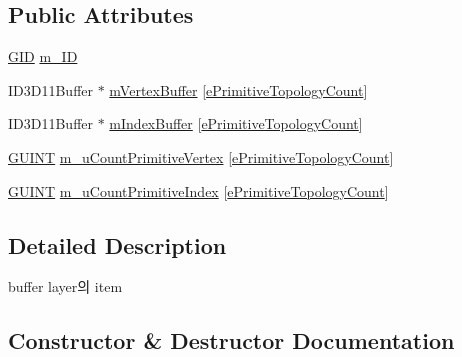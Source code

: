 \subsection*{Public Attributes}
\begin{DoxyCompactItemize}
\item 
\hyperlink{_g_types_8h_a5b96ecb16d8e437977d12cd40aa6f6d8}{G\+I\+D} \hyperlink{class_c_g_d_c_direct_x11_buffer_layer_item_adf7f1aafcdc633a5bdd262079465beb0}{m\+\_\+\+I\+D}
\item 
I\+D3\+D11\+Buffer $\ast$ \hyperlink{class_c_g_d_c_direct_x11_buffer_layer_item_a4f922dc0b74dedbd1afdb2bbb2039a5d}{m\+Vertex\+Buffer} \mbox{[}\hyperlink{_g_types_8h_a940e3da6a9b57aae3de0b050e2a7af5ea56720d72cac9bad09b72706620aa1964}{e\+Primitive\+Topology\+Count}\mbox{]}
\item 
I\+D3\+D11\+Buffer $\ast$ \hyperlink{class_c_g_d_c_direct_x11_buffer_layer_item_ad03525c09e59ec0fa64386bccd696e95}{m\+Index\+Buffer} \mbox{[}\hyperlink{_g_types_8h_a940e3da6a9b57aae3de0b050e2a7af5ea56720d72cac9bad09b72706620aa1964}{e\+Primitive\+Topology\+Count}\mbox{]}
\item 
\hyperlink{_g_types_8h_a415305cdf38fc38f67c037973e9a748c}{G\+U\+I\+N\+T} \hyperlink{class_c_g_d_c_direct_x11_buffer_layer_item_ada713bf18994673621bea4c26c41de3e}{m\+\_\+u\+Count\+Primitive\+Vertex} \mbox{[}\hyperlink{_g_types_8h_a940e3da6a9b57aae3de0b050e2a7af5ea56720d72cac9bad09b72706620aa1964}{e\+Primitive\+Topology\+Count}\mbox{]}
\item 
\hyperlink{_g_types_8h_a415305cdf38fc38f67c037973e9a748c}{G\+U\+I\+N\+T} \hyperlink{class_c_g_d_c_direct_x11_buffer_layer_item_a8c677279a8c355fa7d946b97a24fbb57}{m\+\_\+u\+Count\+Primitive\+Index} \mbox{[}\hyperlink{_g_types_8h_a940e3da6a9b57aae3de0b050e2a7af5ea56720d72cac9bad09b72706620aa1964}{e\+Primitive\+Topology\+Count}\mbox{]}
\end{DoxyCompactItemize}


\subsection{Detailed Description}

\begin{DoxyItemize}
\item buffer layer의 item 
\end{DoxyItemize}

\subsection{Constructor \& Destructor Documentation}
\hypertarget{class_c_g_d_c_direct_x11_buffer_layer_item_a4d3717fab3a24d63d4da7df07a5ccac1}{}
